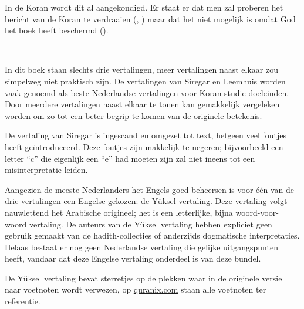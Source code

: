 In de Koran wordt dit al aangekondigd.  Er staat er dat men zal proberen het bericht van de Koran te verdraaien (, ) maar dat het niet mogelijk is omdat God het boek heeft beschermd ().
\vspace{0.3cm}

\newpage
\mbox{~}
\vspace{3cm}

\noindent In dit boek staan slechts drie vertalingen, meer vertalingen naast elkaar zou simpelweg niet praktisch zijn.  De vertalingen van Siregar en Leemhuis worden vaak genoemd als beste Nederlandse vertalingen voor Koran studie doeleinden.  Door meerdere vertalingen naast elkaar te tonen kan gemakkelijk vergeleken worden om zo tot een beter begrip te komen van de originele betekenis.

De vertaling van Siregar is ingescand en omgezet tot text, hetgeen veel foutjes heeft geïntroduceerd.  Deze foutjes zijn makkelijk te negeren; bijvoorbeeld een letter ``c'' die eigenlijk een ``e'' had moeten zijn zal niet ineens tot een misinterpretatie leiden.

Aangezien de meeste Nederlanders het Engels goed beheersen is voor één van de drie vertalingen een Engelse gekozen: de Yüksel vertaling.  Deze vertaling volgt nauwlettend het Arabische origineel; het is een letterlijke, bijna woord-voor-woord vertaling.  De auteurs van de Yüksel vertaling hebben expliciet geen gebruik gemaakt van de hadith-collecties of anderzijds dogmatische interpretaties.  Helaas bestaat er nog geen Nederlandse vertaling die gelijke uitgangspunten heeft, vandaar dat deze Engelse vertaling onderdeel is van deze bundel.

De Yüksel vertaling bevat sterretjes op de plekken waar in de originele versie naar voetnoten wordt verwezen, op \href{http://quranix.com}{quranix.com} staan alle voetnoten ter referentie.
\vspace{0.3cm}

